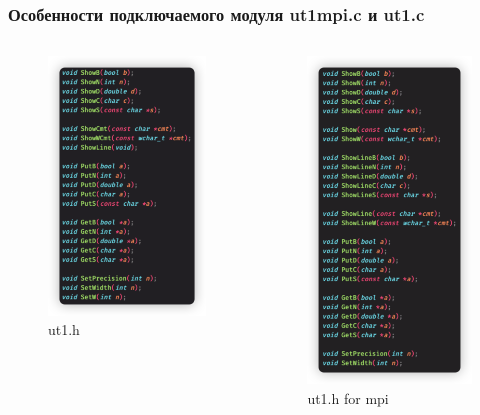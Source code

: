 \begin{frame}
\frametitle{Особенности подключаемого модуля ut1mpi.c и ut1.c}

\begin{columns}
\begin{figure}[htbp]%
    \centering
    \includegraphics[width=0.6\linewidth]{images/ut1.jpg}%
    \caption{ut1.h}%
    \label{ut1}%
\end{figure}

\begin{figure}[htbp]%
    \centering
    \includegraphics[width=0.5\linewidth]{images/ut1mpi.jpg}%
    \caption{ut1.h for mpi}%
    \label{ut1mpi}%
\end{figure}
\end{columns}


\end{frame}
